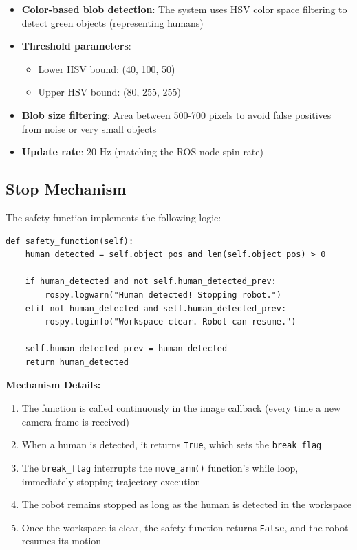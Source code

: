 \documentclass[11pt,letterpaper]{article}
\begin{document}
\begin{itemize}[leftmargin=*]
    \item \textbf{Color-based blob detection}: The system uses HSV color space filtering to detect green objects (representing humans)
    \item \textbf{Threshold parameters}: 
    \begin{itemize}
        \item Lower HSV bound: (40, 100, 50)
        \item Upper HSV bound: (80, 255, 255)
    \end{itemize}
    \item \textbf{Blob size filtering}: Area between 500-700 pixels to avoid false positives from noise or very small objects
    \item \textbf{Update rate}: 20 Hz (matching the ROS node spin rate)
\end{itemize}

\subsection{Stop Mechanism}

The safety function implements the following logic:

\begin{lstlisting}
def safety_function(self):
    human_detected = self.object_pos and len(self.object_pos) > 0
    
    if human_detected and not self.human_detected_prev:
        rospy.logwarn("Human detected! Stopping robot.")
    elif not human_detected and self.human_detected_prev:
        rospy.loginfo("Workspace clear. Robot can resume.")
    
    self.human_detected_prev = human_detected
    return human_detected
\end{lstlisting}

\textbf{Mechanism Details:}
\begin{enumerate}[leftmargin=*]
    \item The function is called continuously in the image callback (every time a new camera frame is received)
    \item When a human is detected, it returns \texttt{True}, which sets the \texttt{break\_flag}
    \item The \texttt{break\_flag} interrupts the \texttt{move\_arm()} function's while loop, immediately stopping trajectory execution
    \item The robot remains stopped as long as the human is detected in the workspace
    \item Once the workspace is clear, the safety function returns \texttt{False}, and the robot resumes its motion
\end{enumerate}
\end{document}
